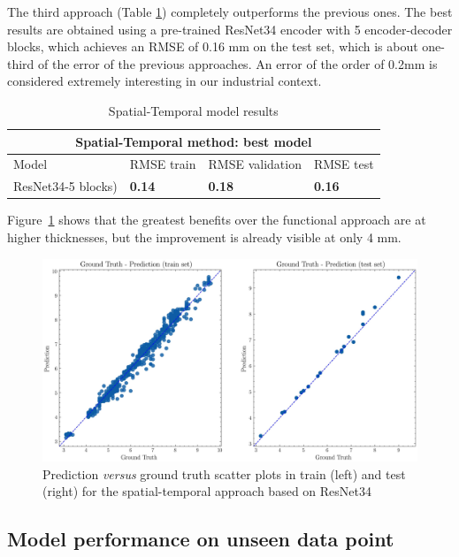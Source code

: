 The third approach (Table \ref{tab:spatial_temporal_model_results}) completely outperforms the previous ones. The best results are obtained using a pre-trained ResNet34 encoder with 5 encoder-decoder blocks, which achieves an RMSE of 0.16 mm on the test set, which is about one-third of the error of the previous approaches. An error of the order of 0.2mm is considered extremely interesting in our industrial context. 
\begin{table}
    \centering
    \begin{tabular}{|p{3.5cm}|p{3.2cm}|p{3.2cm}|p{2.8cm}|}
    \hline
    \multicolumn{4}{|c|}{Spatial-Temporal method: best model} \\
    \hline
    Model & RMSE train  & RMSE validation  & RMSE test  \\
    \hline
    ResNet34-5 blocks) & \textbf{0.14} & \textbf{0.18} & \textbf{0.16} \\
    \hline
    \end{tabular}
    \caption{Spatial-Temporal model results}
    \label{tab:spatial_temporal_model_results}
\end{table}
Figure~\ref{fig:gt_prediction_spatial_temporal} shows that the greatest benefits over the functional approach are at higher thicknesses, but the improvement is already visible at only 4 mm.

\begin{figure}
\centering
\includegraphics[scale=0.48]{images/chapter_4/gt_spatial_temporal.eps}
\caption{Prediction \textit{versus} ground truth scatter plots in train (left) and test (right) for the spatial-temporal approach based on ResNet34}
\label{fig:gt_prediction_spatial_temporal}
\end{figure}

\subsection{Model performance on unseen data point}

